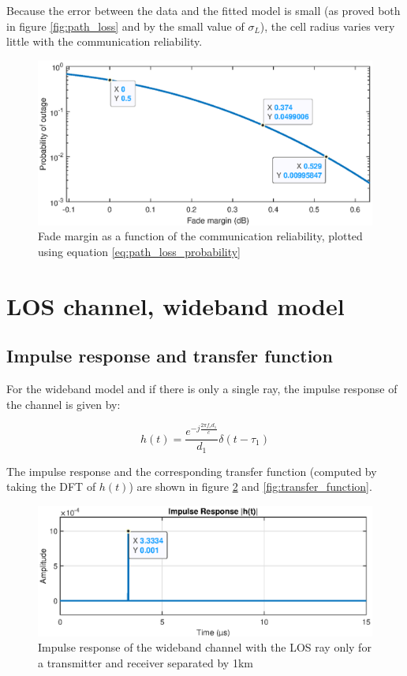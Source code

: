 \documentclass[10pt,a4paper]{ULBreport}
\begin{document}
Because the error between the data and the fitted model is small (as proved both in figure \ref{fig:path_loss} and by the small value of $\sigma_L$), the cell radius varies very little with the communication reliability. 

\begin{figure}[H]
    \centering
    \includegraphics[width=1\textwidth]{3_7.eps}
    \caption{Fade margin as a function of the communication reliability, plotted using equation \ref{eq:path_loss_probability}}
    \label{fig:fade_margin}
\end{figure}

\section{LOS channel, wideband model}
\label{sec:LOS_channel_wideband}

\subsection{Impulse response and transfer function}
For the wideband model and if there is only a single ray, the impulse response of the channel is given by:

\begin{equation*}
    h(t) = \frac{e^{-j \frac{2\pi f_cd_1}{c}}}{d_1} \delta(t - \tau_1)
\end{equation*}

The impulse response and the corresponding transfer function (computed by taking the DFT of $h(t)$) are shown in figure \ref{fig:impulse_response} and \ref{fig:transfer_function}. 

\begin{figure}[H]
    \centering
    \includegraphics[width=1\textwidth]{4_1_temp.eps}
    \caption{Impulse response of the wideband channel with the LOS ray only for a transmitter and receiver separated by 1km} 
    \label{fig:impulse_response}
\end{figure}
\end{document}
